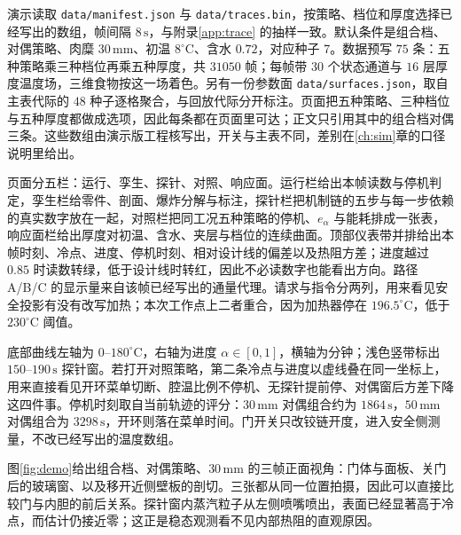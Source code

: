 演示读取 \texttt{data/manifest.json} 与 \texttt{data/traces.bin}，按策略、档位和厚度选择已经写出的数组，帧间隔 \(8\,\mathrm{s}\)，与附录\ref{app:trace} 的抽样一致。默认条件是组合档、对偶策略、肉糜 \(30\,\mathrm{mm}\)、初温 \(8^\circ\mathrm{C}\)、含水 \(0.72\)，对应种子 7。数据预写 \(75\) 条：五种策略乘三种档位再乘五种厚度，共 \(31050\) 帧；每帧带 \(30\) 个状态通道与 \(16\) 层厚度温度场，三维食物按这一场着色。另有一份参数面 \texttt{data/surfaces.json}，取自主表代际的 \(48\) 种子逐格聚合，与回放代际分开标注。页面把五种策略、三种档位与五种厚度都做成选项，因此每条都在页面里可达；正文只引用其中的组合档对偶三条。这些数组由演示版工程核写出，开关与主表不同，差别在\ref{ch:sim}{}章的口径说明里给出。

页面分五栏：运行、孪生、探针、对照、响应面。运行栏给出本帧读数与停机判定，孪生栏给零件、剖面、爆炸分解与标注，探针栏把机制链的五步与每一步依赖的真实数字放在一起，对照栏把同工况五种策略的停机、\(e_{\alpha}\) 与能耗排成一张表，响应面栏给出厚度对初温、含水、夹层与档位的连续曲面。顶部仪表带并排给出本帧时刻、冷点、进度、停机时刻、相对设计线的偏差以及热阻方差；进度越过 \(0.85\) 时读数转绿，低于设计线时转红，因此不必读数字也能看出方向。路径 A/B/C 的显示量来自该帧已经写出的通量代理。请求与指令分两列，用来看见安全投影有没有改写加热；本次工作点上二者重合，因为加热器停在 \(196.5^\circ\mathrm{C}\)，低于 \(230^\circ\mathrm{C}\) 阈值。

底部曲线左轴为 \(0\)--\(180^\circ\mathrm{C}\)，右轴为进度 \(\alpha\in[0,1]\)，横轴为分钟；浅色竖带标出 \(150\)--\(190\,\mathrm{s}\) 探针窗。若打开对照策略，第二条冷点与进度以虚线叠在同一坐标上，用来直接看见开环菜单切断、腔温比例不停机、无探针提前停、对偶窗后方差下降这四件事。停机时刻取自当前轨迹的评分：\(30\,\mathrm{mm}\) 对偶组合约为 \(1864\,\mathrm{s}\)，\(50\,\mathrm{mm}\) 对偶组合为 \(3298\,\mathrm{s}\)，开环则落在菜单时间。门开关只改铰链开度，进入安全侧测量，不改已经写出的温度数组。

图\ref{fig:demo}{}给出组合档、对偶策略、\(30\,\mathrm{mm}\) 的三帧正面视角：门体与面板、关门后的玻璃窗、以及移开近侧壁板的剖切。三张都从同一位置拍摄，因此可以直接比较门与内胆的前后关系。探针窗内蒸汽粒子从左侧喷嘴喷出，表面已经显著高于冷点，而估计仍接近零；这正是稳态观测看不见内部热阻的直观原因。

